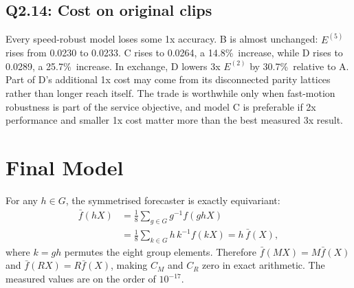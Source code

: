 \documentclass{article}
\newcommand{\pct}{\%\ }
\newcommand{\Efive}{\ensuremath{E^{(5)}}}
\newcommand{\Etwo}{\ensuremath{E^{(2)}}}
\newcommand{\CM}{\ensuremath{C_M}}
\newcommand{\CR}{\ensuremath{C_R}}
\begin{document}
\subsection*{Q2.14: Cost on original clips}

Every speed-robust model loses some 1x accuracy. B is almost unchanged: \Efive{} rises from 0.0230 to 0.0233. C rises to 0.0264, a 14.8\pct increase, while D rises to 0.0289, a 25.7\pct increase. In exchange, D lowers 3x \Etwo{} by 30.7\pct relative to A. Part of D's additional 1x cost may come from its disconnected parity lattices rather than longer reach itself. The trade is worthwhile only when fast-motion robustness is part of the service objective, and model C is preferable if 2x performance and smaller 1x cost matter more than the best measured 3x result.

\section{Final Model}
\label{sec:q2-final}

For any $h\in G$, the symmetrised forecaster is exactly equivariant:
\begin{align}
 \bar f(hX)
 &=\frac{1}{8}\sum_{g\in G}g^{-1}f(ghX) \\
 &=\frac{1}{8}\sum_{k\in G}h\,k^{-1}f(kX)
 =h\,\bar f(X),
\end{align}
where $k=gh$ permutes the eight group elements. Therefore $\bar f(MX)=M\bar f(X)$ and $\bar f(RX)=R\bar f(X)$, making \CM{} and \CR{} zero in exact arithmetic. The measured values are on the order of $10^{-17}$.
\end{document}

